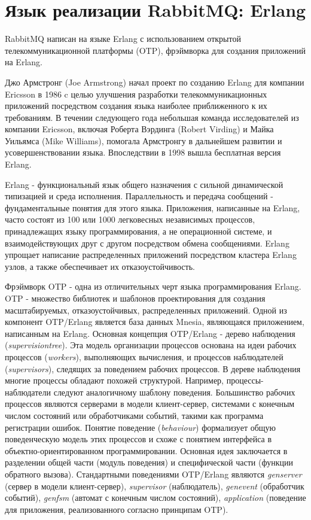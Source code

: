 \section{Язык реализации RabbitMQ: Erlang}
RabbitMQ написан на языке Erlang с использованием  открытой телекоммуникационной платформы (OTP),
фрэймворка для создания приложений на Erlang. \par
Джо Армстронг (Joe Armstrong) начал проект по созданию Erlang для компании Ericsson в 1986 c целью улучшения разработки телекоммуникационных приложений посредством создания языка наиболее приближенного к их требованиям. В течении следующего года небольшая команда исследователей из компании Ericsson, включая Роберта Вэрдинга (Robert Virding) и Майка Уильямса (Mike Williams), помогала Армстронгу в дальнейшем развитии и усовершенствовании языка. Впоследствии в 1998 вышла бесплатная версия Erlang.\par
Erlang - функциональный язык общего назначения с сильной динамической типизацией и среда исполнения. Параллельность и передача сообщений - фундаментальные понятия для этого языка. Приложения, написанные на Erlang, часто состоят из 100 или 1000 легковесных независимых процессов, принадлежащих языку программирования, а не операционной системе, и взаимодействующих друг с другом посредством обмена сообщениями. Erlang упрощает написание распределенных приложений посредством кластера Erlang узлов, а также обеспечивает их отказоустойчивость.\par
Фрэймворк OTP - одна из отличительных черт языка программирования Erlang. OTP - множество библиотек и шаблонов проектирования для создания масштабируемых, отказоустойчивых, распределенных приложений. Одной из компонент OTP/Erlang является база данных Mnesia, являющаяся приложением, написанным на Erlang. Основная концепция OTP/Erlang - дерево наблюдения (\textit{supervision\thinspace tree}). Эта  модель организации процессов основана на идеи рабочих процессов (\textit{workers}), выполняющих вычисления, и процессов наблюдателей (\textit{supervisors}), следящих за поведением рабочих процессов. В дереве наблюдения многие процессы обладают похожей структурой. Например, процессы-наблюдатели следуют аналогичному шаблону поведения. Большинство рабочих процессов являются серверами в модели клиент-сервер, системами с конечным числом состояний  или обработчиками событий, такими как программа регистрации ошибок. Понятие поведение (\textit{behaviour}) формализует общую поведенческую модель этих процессов и схоже с понятием интерфейса в объектно-ориентированном программировании.  Основная идея заключается в разделении общей части (модуль поведения) и специфической части (функции обратного вызова). Стандартными поведениями OTP/Erlang являются \textit{gen\underline{\hspace{0.25cm}}server} (сервер в модели клиент-сервер), \textit{supervisor} (наблюдатель), \textit{gen\underline{\hspace{0.25cm}}event} (обработчик событий), \textit{gen\underline{\hspace{0.25cm}}fsm} (автомат с конечным числом состояний), \textit{application} (поведение для приложения, реализованного согласно принципам OTP). \par
